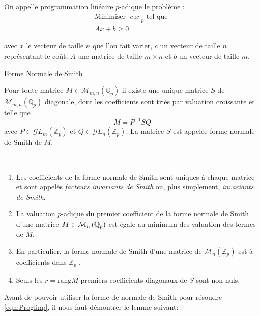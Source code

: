 On appelle programmation linéaire $p$-adique le problème :
\begin{equation}
	  \tag{PLp}
\begin{matrix}
	\text{Minimiser } |c.x|_p \text{ tel que }\\
	Ax + b \ge 0
 \end{matrix}
	    \label{eqn:Proglinp}
\end{equation}

avec $x$ le vecteur de taille $n$ que l'on fait varier, $c$ un vecteur de taille $n$ représentant le coût, $A$ une matrice de taille $m \times n $ et $b$ un vecteur de taille $m$.


\begin{definition}
	Forme Normale de Smith

	Pour toute matrice $M \in \mathcal{M}_{m,n}\left( \mathbb{Q}_{ p }  \right) $ il existe une unique matrice $S$ de $\mathcal{M}_{m,n}\left( \mathbb{Q}_{ p }  \right) $ diagonale, dont les coefficients sont triés par valuation croissante et telle que
	\[
		M = P^{-1} S Q
	\]
 avec $P \in \mathcal{G}L_m\left( \mathbb{Z}_p \right)$ et $ Q \in \mathcal{G}L_n\left( \mathbb{Z}_p \right)$. La matrice $S$ est appelée forme normale de Smith de $M$.
\end{definition}

\begin{remarques}
~

	\begin{enumerate}[label=\roman*.]
		\item Les coefficients de la forme normale de Smith sont uniques à chaque matrice et sont appelés \textit{facteurs invariants de Smith} ou, plus simplement, \textit{invariants de Smith}.
		\item La valuation $p$-adique du premier coefficient de la forme normale de Smith d'une matrice $M \in \mathcal{M}_n \left( \mathbb{Q}_p \right) $ est égale au minimum des valuation des termes de $M$.
		\item En particulier, la forme normale de Smith d'une matrice de $\mathcal{M}_n \left( \mathbb{Z}_p \right) $ est à coefficients dans $\mathbb{Z}_p$ .
		\item Seuls les $r = \text{rang} M$ premiers coefficients diagonaux de $S$ sont non nuls.  
	\end{enumerate}

\end{remarques}

Avant de pouvoir utiliser la forme de normale de Smith pour résoudre \ref{eqn:Proglinp}, il nous faut démontrer le lemme suivant:

